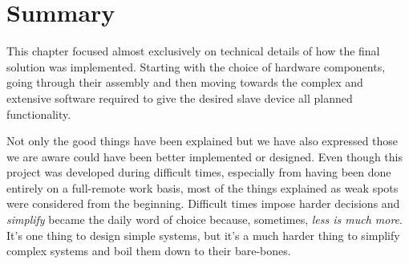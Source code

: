 \section{Summary} \label{sec:impl-summary}
This chapter focused almost exclusively on technical details of how the final solution was implemented.
Starting with the choice of hardware components, going through their assembly and then moving towards the complex and extensive software required to give the desired slave device all planned functionality.

Not only the good things have been explained but we have also expressed those we are aware could have been better implemented or designed.
Even though this project was developed during difficult times, especially from having been done entirely on a full-remote work basis, most of the things explained as weak spots were considered from the beginning.
Difficult times impose harder decisions and \emph{simplify} became the daily word of choice because, sometimes, \emph{less is much more}.
It's one thing to design simple systems, but it's a much harder thing to simplify complex systems and boil them down to their bare-bones.
